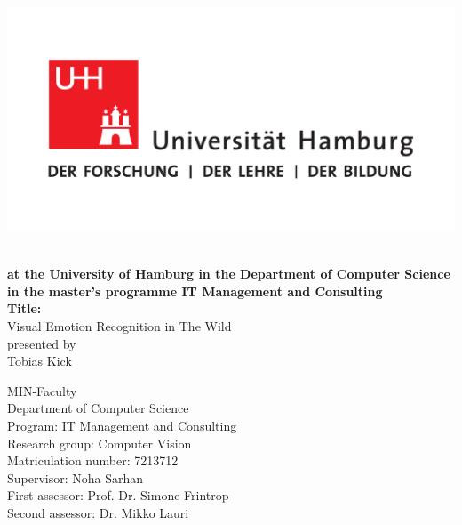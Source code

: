 \documentclass[11pt,a4paper]{scrbook}
\begin{document}
\frontmatter  %
\begin{titlepage}
\includegraphics[scale=0.3]{UHH-Logo_2010_Farbe_CMYK.pdf}
\vspace*{2.0cm}
\Large
\begin{center}
{\color{uhhred}\textbf{}}
\vspace*{1.0cm}\\
{\textbf{at the University of Hamburg in the Department of Computer Science in the master's programme IT Management and Consulting}}
\vspace*{2.0cm}\\
{\LARGE \textbf{Title:}}
\vspace*{0.4cm}\\
{\LARGE Visual Emotion Recognition in The Wild}
\vspace*{1.5cm}\\
presented by
\vspace*{0.4cm}\\
Tobias Kick
\end{center}
\vspace*{2.0cm}

\noindent
MIN-Faculty \vspace*{0.25cm} \\
Department of Computer Science\vspace*{0.25cm} \\
Program: IT Management and Consulting\vspace*{0.25cm} \\
Research group: Computer Vision\vspace*{0.25cm} \\
Matriculation number: 7213712 \vspace*{0.5cm} \\
Supervisor: Noha Sarhan \vspace*{0.25cm} \\
First assessor: Prof. Dr. Simone Frintrop \vspace*{0.25cm} \\
Second assessor: Dr. Mikko Lauri


\end{titlepage}
\end{document}
